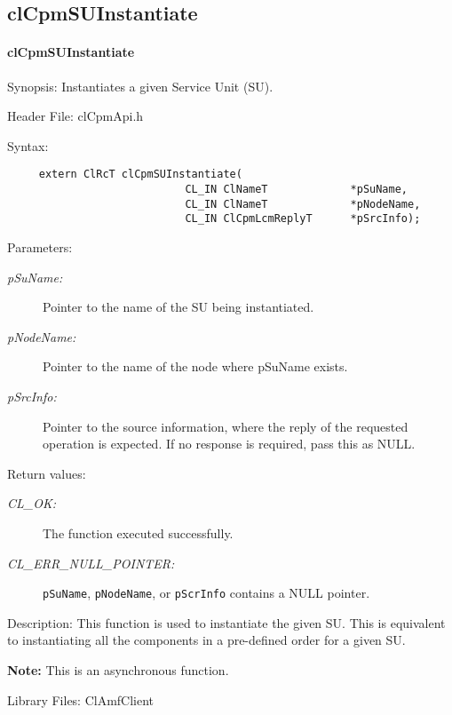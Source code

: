 {\subsection{clCpmSUInstantiate}
\hypertarget{pagecpm133}{}\paragraph{cl\-Cpm\-SUInstantiate}\label{pagecpm133}
\begin{Desc}
\item[Synopsis:]Instantiates a given Service Unit (SU).\end{Desc}
\begin{Desc}
\item[Header File:]clCpmApi.h\end{Desc}
\begin{Desc}
\item[Syntax:]

\footnotesize\begin{verbatim}     extern ClRcT clCpmSUInstantiate(
                			CL_IN ClNameT             *pSuName,
                			CL_IN ClNameT             *pNodeName,
                			CL_IN ClCpmLcmReplyT      *pSrcInfo);
\end{verbatim}
\normalsize
\end{Desc}
\begin{Desc}
\item[Parameters:]
\begin{description}
\item[{\em p\-Su\-Name:}]Pointer to the name of the SU being instantiated. 
\item[{\em p\-Node\-Name:}]Pointer to the name of the node where p\-Su\-Name exists. \item[{\em p\-Src\-Info:}]Pointer to the source information, where 
the reply of the requested operation is expected. If no response is required, pass this as NULL.\end{description}
\end{Desc}
\begin{Desc}
\item[Return values:]
\begin{description}
\item[{\em CL\_\-OK:}]The function executed successfully. \item[{\em CL\_\-ERR\_\-NULL\_\-POINTER:}]{\tt{pSuName}}, 
{\tt{p\-Node\-Name}}, or {\tt{p\-Scr\-Info}} contains a NULL pointer.\end{description}
\end{Desc}
\begin{Desc}
\item[Description:]This function is used to instantiate the given SU. This is equivalent to instantiating all the components in a pre-defined order for a 
given SU.\end{Desc}
{\bf Note:} This is an asynchronous function.
\begin{Desc}
\item[Library Files:]Cl\-Amf\-Client\end{Desc}

}
